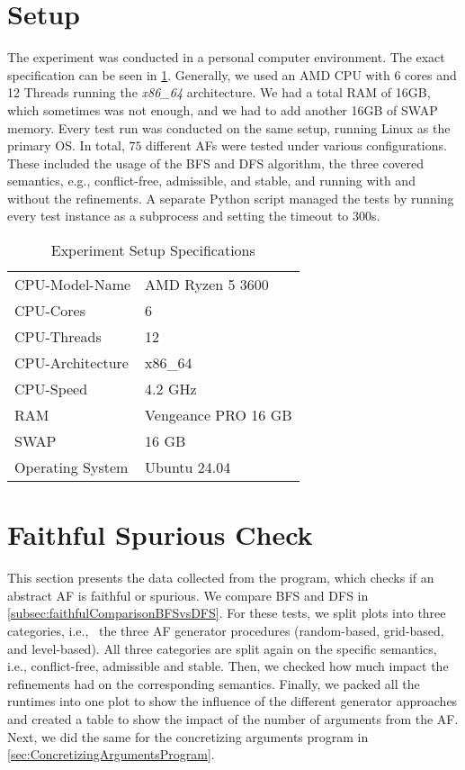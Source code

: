 \section{Setup}
\label{sec:Setup}
The experiment was conducted in a personal computer environment. The exact specification can be seen in \cref{table:ExperimentSpecs}. Generally, we used an AMD CPU with 6 cores and 12 Threads running the \textit{x86\_64} architecture. We had a total RAM of 16GB, which sometimes was not enough, and we had to add another 16GB of SWAP memory. Every test run was conducted on the same setup, running Linux as the primary OS. In total, $75$ different AFs were tested under various configurations. These included the usage of the BFS and DFS algorithm, the three covered semantics, e.g., conflict-free, admissible, and stable, and running with and without the refinements. A separate Python script managed the tests by running every test instance as a subprocess and setting the timeout to 300s.

\begin{table}[H]
    \centering
    \caption{Experiment Setup Specifications}
    \begin{tabular}{ |l|l| }
    \hline
        CPU-Model-Name & AMD Ryzen 5 3600\\
        CPU-Cores & 6\\
        CPU-Threads & 12\\
        CPU-Architecture & x86\_64\\
        CPU-Speed & 4.2 GHz\\
        RAM & Vengeance PRO 16 GB\\
        SWAP & 16 GB\\
        Operating System & Ubuntu 24.04 \\
    \hline
    \end{tabular}
\label{table:ExperimentSpecs}
\end{table}



\section{Faithful Spurious Check}
\label{sec:FaithfulSpuriusCheck}

This section presents the data collected from the program, which checks if an abstract AF is faithful or spurious. We compare BFS and DFS in \cref{subsec:faithfulComparisonBFSvsDFS}. For these tests, we split plots into three categories, i.e., \ the three AF generator procedures (random-based, grid-based, and level-based). All three categories are split again on the specific semantics, i.e., conflict-free, admissible and stable. Then, we checked how much impact the refinements had on the corresponding semantics. Finally, we packed all the runtimes into one plot to show the influence of the different generator approaches and created a table to show the impact of the number of arguments from the AF. Next, we did the same for the concretizing arguments program in \cref{sec:ConcretizingArgumentsProgram}.

